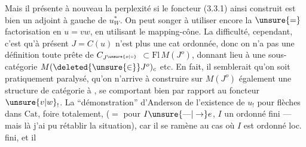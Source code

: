 
Mais il  présente à nouveau la perplexité
si le foncteur (3.3.1) ainsi construit
est bien un adjoint à gauche de $u_W^*$.
On peut songer à utiliser encore la
$\unsure{=}$ factorisation en $u=vw$, en utilisant
le mapping-cône. La difficulté, cependant,
c'est qu'à présent $J=C(u)$ n'est plus une
cat ordonnée, donc on n'a pas une
définition toute prête de  $C_{J^{\unsure{o|\circ}}}$
$\subset\mathrm{Fl}\, M(J^o)$, donnant lieu à
une sous-catégorie $M(\deleted{\unsure{\in}}J^o)_c$ etc. En
fait, il semblerait qu'on soit pratiquement
paralysé,  qu'on n'arrive à construire
sur $M(J^o)$ également une structure
de catégorie à , se comportant
bien par rapport au foncteur $\unsure{v|w}_!$.
La ``démonstration'' d'Anderson de l'existence
de $u_!$ pour \uline{} flèches dans $\mathrm{Cat}$,
foire totalement,  ($=$ pour $I\unsure{\text{---}|\to}e$,
$I$ un ordonné fini --- mais là j'ai
pu rétablir la situation), car il se ramène
au cas où $I$ est ordonné loc. fini, et il
